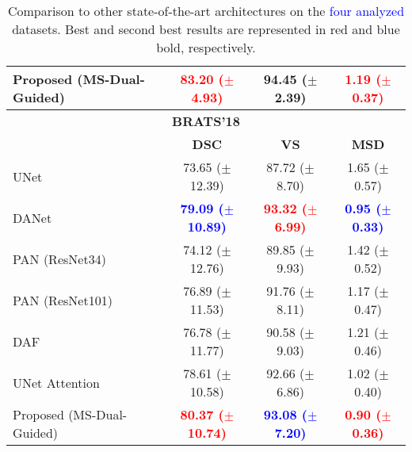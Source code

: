 \documentclass[journal]{IEEEtran}
\begin{document}
\begin{table}[t!]
\begin{tabular}{lccc}
Proposed (MS-Dual-Guided)  &  \textcolor{red}{\textbf{83.20 ($\pm$4.93)}} & 94.45 ($\pm$2.39) & \textcolor{red}{\textbf{1.19 ($\pm$0.37)}} \\
\midrule
\multicolumn{4}{c}{\textbf{BRATS'18}}\\
\midrule
& \textbf{DSC} & \textbf{VS} & \textbf{MSD}\\
 \midrule
UNet \cite{ronneberger2015u}  & 73.65 ($\pm$12.39) & 87.72 ($\pm$8.70) & 1.65 ($\pm$0.57)\\
DANet \cite{fu2018dual}  &  \textcolor{blue}{\textbf{79.09 ($\pm$10.89)}} & \textcolor{red}{\textbf{93.32 ($\pm$6.99)}} &  \textcolor{blue}{\textbf{0.95 ($\pm$0.33)}} \\
PAN (ResNet34) \cite{li2018pyramid}    &  74.12 ($\pm$12.76) & 89.85 ($\pm$9.93) &  1.42 ($\pm$0.52) \\
PAN (ResNet101)\cite{li2018pyramid}   &  76.89 ($\pm$11.53)  & 91.76 ($\pm$8.11) & 1.17 ($\pm$0.47) \\
DAF \cite{wang18d}  &  76.78 ($\pm$11.77) & 90.58 ($\pm$9.03) &  1.21 ($\pm$0.46) \\
UNet Attention \cite{schlemper2019attention} &   78.61 ($\pm$10.58) & 92.66 ($\pm$6.86) & 1.02 ($\pm$0.40) \\
Proposed (MS-Dual-Guided)  &   \textcolor{red}{\textbf{80.37 ($\pm$10.74)}} & \textcolor{blue}{\textbf{93.08 ($\pm$7.20)}} &  \textcolor{red}{\textbf{0.90 ($\pm$0.36)}}\\
\midrule
\end{tabular}

\caption{Comparison to other state-of-the-art architectures on the \textcolor{blue}{four analyzed} datasets. Best and second best results are represented in red and blue bold, respectively. }
\label{table:sota_comp}
\end{table}
\end{document}
